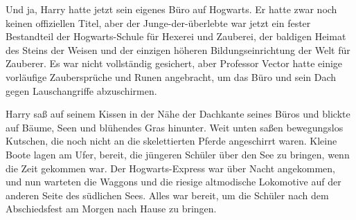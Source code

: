Und ja, Harry hatte jetzt sein eigenes Büro auf Hogwarts. Er hatte zwar noch keinen offiziellen Titel, aber der Junge-der-überlebte war jetzt ein fester Bestandteil der Hogwarts-Schule für Hexerei und Zauberei, der baldigen Heimat des Steins der Weisen und der einzigen höheren Bildungseinrichtung der Welt für Zauberer. Es war nicht vollständig gesichert, aber Professor Vector hatte einige vorläufige Zaubersprüche und Runen angebracht, um das Büro und sein Dach gegen Lauschangriffe abzuschirmen.

Harry saß auf seinem Kissen in der Nähe der Dachkante seines Büros und blickte auf Bäume, Seen und blühendes Gras hinunter. Weit unten saßen bewegungslos Kutschen, die noch nicht an die skelettierten Pferde angeschirrt waren. Kleine Boote lagen am Ufer, bereit, die jüngeren Schüler über den See zu bringen, wenn die Zeit gekommen war. Der Hogwarts-Express war über Nacht angekommen, und nun warteten die Waggons und die riesige altmodische Lokomotive auf der anderen Seite des südlichen Sees. Alles war bereit, um die Schüler nach dem Abschiedsfest am Morgen nach Hause zu bringen.

